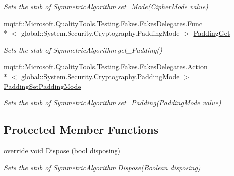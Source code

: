 \begin{DoxyCompactItemize}
\begin{DoxyCompactList}\small\item\em Sets the stub of Symmetric\-Algorithm.\-set\-\_\-\-Mode(\-Cipher\-Mode value)\end{DoxyCompactList}\item 
mqttf\-::\-Microsoft.\-Quality\-Tools.\-Testing.\-Fakes.\-Fakes\-Delegates.\-Func\\*
$<$ global\-::\-System.\-Security.\-Cryptography.\-Padding\-Mode $>$ \hyperlink{class_system_1_1_security_1_1_cryptography_1_1_fakes_1_1_stub_r_c2_a97e5133230ffc8b64d20218ed7af6fc2}{Padding\-Get}
\begin{DoxyCompactList}\small\item\em Sets the stub of Symmetric\-Algorithm.\-get\-\_\-\-Padding()\end{DoxyCompactList}\item 
mqttf\-::\-Microsoft.\-Quality\-Tools.\-Testing.\-Fakes.\-Fakes\-Delegates.\-Action\\*
$<$ global\-::\-System.\-Security.\-Cryptography.\-Padding\-Mode $>$ \hyperlink{class_system_1_1_security_1_1_cryptography_1_1_fakes_1_1_stub_r_c2_a005719d2e29a86d5d82c3891eccb78c9}{Padding\-Set\-Padding\-Mode}
\begin{DoxyCompactList}\small\item\em Sets the stub of Symmetric\-Algorithm.\-set\-\_\-\-Padding(\-Padding\-Mode value)\end{DoxyCompactList}\end{DoxyCompactItemize}
\subsection*{Protected Member Functions}
\begin{DoxyCompactItemize}
\item 
override void \hyperlink{class_system_1_1_security_1_1_cryptography_1_1_fakes_1_1_stub_r_c2_aea1d27ad81b5847a36208aa7dd6dbdb4}{Dispose} (bool disposing)
\begin{DoxyCompactList}\small\item\em Sets the stub of Symmetric\-Algorithm.\-Dispose(\-Boolean disposing)\end{DoxyCompactList}\end{DoxyCompactItemize}
